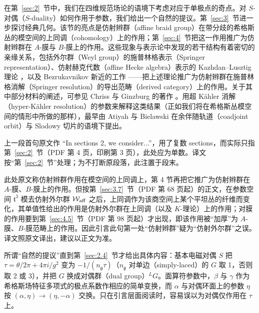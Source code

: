 在第~\ref{sec:2}~节中，我们在四维规范场论的语境下考虑对应于单极点的奇点。对 $S$-对偶（$S$-duality）如何作用于参数，我们给出一个自然的提议。第~\ref{sec:3}~节进一步探讨经典几何。该节的亮点是仿射辫群（affine braid group）在带分歧的希格斯丛的模空间的上同调（cohomology）上的作用；第~\ref{sec:4}~节把这一作用推广为仿射辫群在 $A$-膜与 $B$-膜上的作用。这些现象与表示论中发现的若干结构有着密切的亲缘关系，包括外尔群（Weyl group）的施普林格表示（Springer representation）\cite{ref26}、仿射赫克代数（affine Hecke algebra）表示的 Kazhdan--Lusztig 理论 \cite{ref27,ref28}，以及 Bezrukavnikov 新近的工作 \cite{ref29}——把上述理论推广为仿射辫群在施普林格消解（Springer resolution）的导出范畴（derived category）上的作用。关于其中部分材料的阐述，可参见 Chriss 与 Ginzburg 的著作 \cite{ref30}。用超 Kähler 消解（hyper-Kähler resolution）的参数来解释这类结果（正如我们将在希格斯丛模空间的情形中所做的那样），最早由 Atiyah 与 Bielawski \cite{ref31} 在余伴随轨道（coadjoint orbit）与 Slodowy 切片的语境下提出。

\begin{yizhu}[原文疑误]
上一段首句原文作 “In sections 2, we consider...”，用了复数 sections，而实际只指第~\ref{sec:2}~节（PDF 第 4 页，印刷第 3 页），此处应为单数。译文按“第~\ref{sec:2}~节”处理；为不打断原段落，此注置于段末。
\end{yizhu}

\begin{yizhu}[原文疑误]
此处原文称仿射辫群作用在模空间的上同调上，第 4 节再把它推广为仿射辫群在 $A$-膜、$B$-膜上的作用。但按第~\ref{sec:3.7}~节（PDF 第 68 页起）的正文，在参数空间 $\mathfrak t^3$ 模去仿射外尔群 ${\mathcal W}_{\rm aff}$ 之后，上同调作为该商空间上某个平坦丛的纤维而变化，其单值性给出的作用是仿射外尔群在上同调（以及 $K$-理论）上的作用；对膜的作用要到第~\ref{sec:4.5}~节（PDF 第 98 页起）才出现，即该作用被“加厚”为 $A$-膜、$B$-膜范畴上的作用。因此引言此句第一处“仿射辫群”疑为“仿射外尔群”之误。译文照原文译出，建议以正文为准。
\end{yizhu}

\begin{yizhu}[含糊点拨]
所谓“自然的提议”直到第~\ref{sec:2.4}~节才给出具体内容：基本电磁对偶 $S$ 把 $\tau=\theta/2\pi+4\pi i/g^2$ 变为 $-1/(n_{\mathfrak g}\tau)$（$n_{\mathfrak g}$ 对单边（simply-laced）的 $G$ 取 1，否则取 2 或 3），并把 $G$ 换成对偶群（dual group）${}^LG$。面算符参数中，$\beta$ 与 $\gamma$ 作为希格斯场特征多项式的极点系数作相应的简单变换，而 $\alpha$ 与对偶环面上的参数 $\eta$ 按 $(\alpha,\eta)\to(\eta,-\alpha)$ 交换。只在引言层面阅读时，容易误以为对偶仅作用在 $\tau$ 上。
\end{yizhu}

